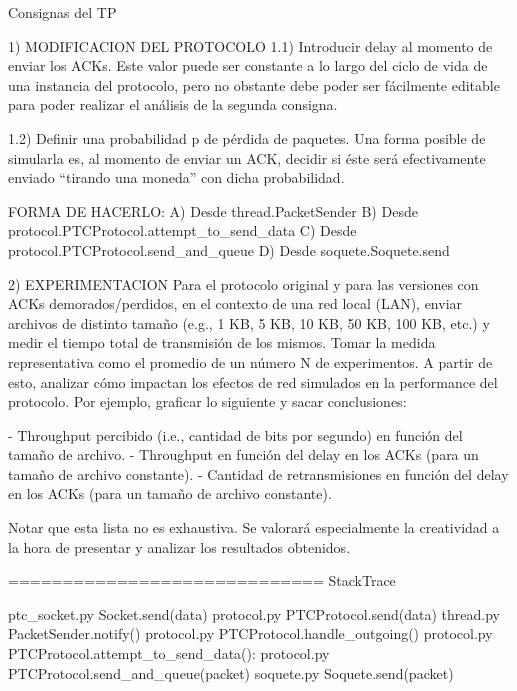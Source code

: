 Consignas del TP

1) MODIFICACION DEL PROTOCOLO
	1.1) Introducir delay al momento de enviar los ACKs. Este valor puede ser constante a lo largo del ciclo de vida de una instancia del protocolo, pero no obstante debe poder ser fácilmente editable para poder realizar el análisis de la segunda consigna.

	1.2) Definir una probabilidad p de pérdida de paquetes. Una forma posible de simularla es, al momento de enviar un ACK, decidir si éste será efectivamente enviado “tirando una moneda” con dicha probabilidad.

FORMA DE HACERLO: 
	A) Desde thread.PacketSender
	B) Desde protocol.PTCProtocol.attempt_to_send_data
	C) Desde protocol.PTCProtocol.send_and_queue
	D) Desde soquete.Soquete.send


2) EXPERIMENTACION
Para el protocolo original y para las versiones con ACKs demorados/perdidos, en el contexto de una red local (LAN), enviar archivos de distinto tamaño (e.g., 1 KB, 5 KB, 10 KB, 50 KB, 100 KB, etc.) y medir el tiempo total de transmisión de los mismos. Tomar la medida representativa como el promedio de un número N de experimentos. A partir de esto, analizar cómo impactan los efectos de red simulados en la performance del protocolo. Por ejemplo, graficar lo siguiente y sacar conclusiones: 

	- Throughput percibido (i.e., cantidad de bits por segundo) en función del tamaño de archivo.
	- Throughput en función del delay en los ACKs (para un tamaño de archivo constante).
	- Cantidad de retransmisiones en función del delay en los ACKs (para un tamaño de archivo constante).

Notar que esta lista no es exhaustiva. Se valorará especialmente la creatividad a la hora de presentar y
analizar los resultados obtenidos.




=============================
StackTrace

ptc_socket.py 	Socket.send(data)
protocol.py 	PTCProtocol.send(data)
thread.py		PacketSender.notify()
protocol.py 	PTCProtocol.handle_outgoing()
protocol.py		PTCProtocol.attempt_to_send_data():
protocol.py 	PTCProtocol.send_and_queue(packet)
soquete.py 		Soquete.send(packet)
